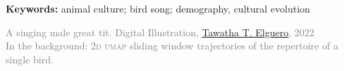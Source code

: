 \documentclass[9pt, twocolumn, twoside]{nilosthesis}
\begin{document}
    {\small\textsf{\textbf{Keywords:} animal culture; bird song; demography, cultural evolution}}

    \vspace{.5cm}

\begin{multicols}{2} %
    
    \end{multicols} %
    \onecolumn




\thispagestyle{empty}
\onecolumn 
\normalsize
 \vspace*{5cm} %
\begin{center}
\end{center}
    \vspace*{\fill}
\begin{center}
        \textcolor{gray}{A singing male great tit. Digital Illustration, \href{https://www.instagram.com/tawatha.blog}{Tawatha T. Elguero}, 2022\\In the background: \textsc{2d umap} sliding window trajectories of the repertoire of a single bird.}
\end{center}
\afterpage{\restorepagecolor}


\onecolumn %
\end{document}
